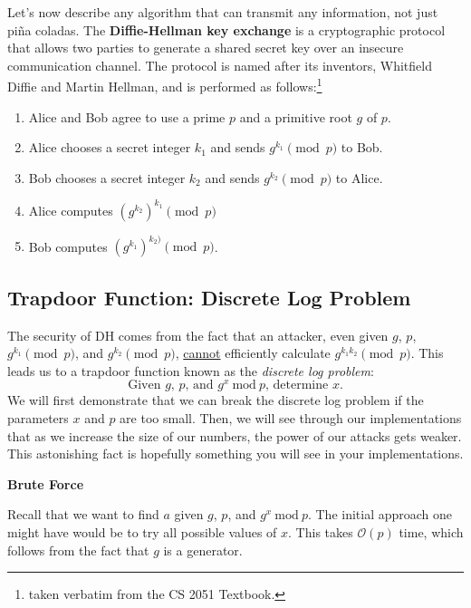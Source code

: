 \documentclass{article}
\begin{document}
    \vspace{3mm}
    Let's now describe any algorithm that can transmit any information, not just piña coladas. The \textbf{Diffie-Hellman key exchange} is a cryptographic protocol that allows two parties to generate a shared secret key over an insecure communication channel. The protocol is named after its inventors, Whitfield Diffie and Martin Hellman, and is performed as follows:\footnote{taken verbatim from the CS 2051 Textbook.}
    \begin{enumerate}[label = \arabic*]
        \item Alice and Bob agree to use a prime $p$ and a primitive root $g$ of $p$.
        \item Alice chooses a secret integer $k_{1}$ and sends $g^{k_{1}} \pmod{p}$ to Bob.
        \item Bob chooses a secret integer $k_{2}$ and sends $g^{k_{2}} \pmod{p}$ to Alice.
        \item Alice computes $(g^{k_{2}})^{k_{1}} \pmod{p}$
        \item Bob computes $(g^{k_{1}})^{k_{2})}\pmod{p}$.
    \end{enumerate}

\subsection*{Trapdoor Function: Discrete Log Problem}
    The security of DH comes from the fact that an attacker, even given $g$, $p$, $g^{k_{1}} \pmod{p}$, and $g^{k_{2}} \pmod{p}$, \underline{cannot} efficiently calculate $g^{k_{1} k_{2}} \pmod{p}$. This leads us to a trapdoor function known as the \textit{discrete log problem}: $$\text{Given $g$, $p$, and $g^{x}\ \text{mod}\ p$, determine $x$}.$$ We will first demonstrate that we can break the discrete log problem if the parameters $x$ and $p$ are too small. Then, we will see through our implementations that as we increase the size of our numbers, the power of our attacks gets weaker. This astonishing fact is hopefully something you will see in your implementations.

    \begin{center}
        \textbf{Brute Force}
    \end{center}

    Recall that we want to find $a$ given $g$, $p$, and $g^{x}\ \text{mod}\ p$. The initial approach one might have would be to try all possible values of $x$. This takes $\mathcal{O}(p)$ time, which follows from the fact that $g$ is a generator.
    
\end{document}
